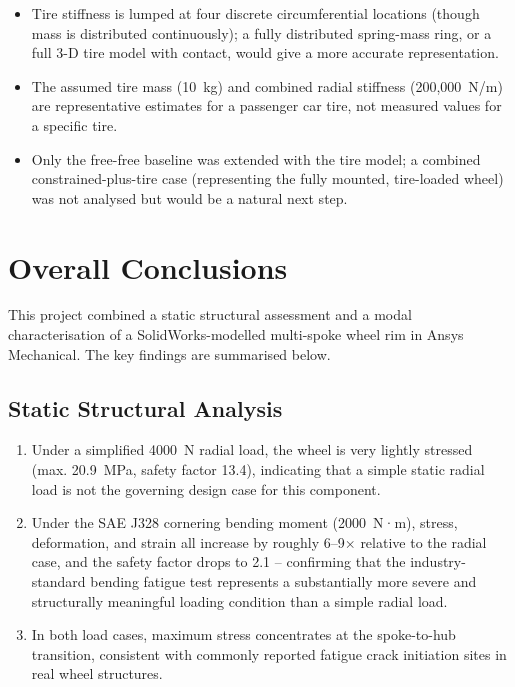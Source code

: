 \documentclass[11pt]{article}
\begin{document}
\begin{itemize}
    \item Tire stiffness is lumped at four discrete circumferential locations (though
    mass is distributed continuously); a fully distributed spring-mass ring, or a full
    3-D tire model with contact, would give a more accurate representation.
    \item The assumed tire mass (10~kg) and combined radial stiffness
    (200{,}000~N/m) are representative estimates for a passenger car tire, not measured
    values for a specific tire.
    \item Only the free-free baseline was extended with the tire model; a combined
    constrained-plus-tire case (representing the fully mounted, tire-loaded wheel) was
    not analysed but would be a natural next step.
\end{itemize}

\section{Overall Conclusions}

This project combined a static structural assessment and a modal characterisation of a
SolidWorks-modelled multi-spoke wheel rim in Ansys Mechanical. The key findings are
summarised below.

\subsection{Static Structural Analysis}

\begin{enumerate}
    \item Under a simplified 4000~N radial load, the wheel is very lightly stressed
    (max. 20.9~MPa, safety factor 13.4), indicating that a simple static radial load is
    not the governing design case for this component.
    \item Under the SAE J328 cornering bending moment (2000~N·m), stress,
    deformation, and strain all increase by roughly 6--9$\times$ relative to the radial
    case, and the safety factor drops to 2.1 -- confirming that the industry-standard
    bending fatigue test represents a substantially more severe and structurally
    meaningful loading condition than a simple radial load.
    \item In both load cases, maximum stress concentrates at the spoke-to-hub
    transition, consistent with commonly reported fatigue crack initiation sites in
    real wheel structures.
\end{enumerate}
\end{document}
